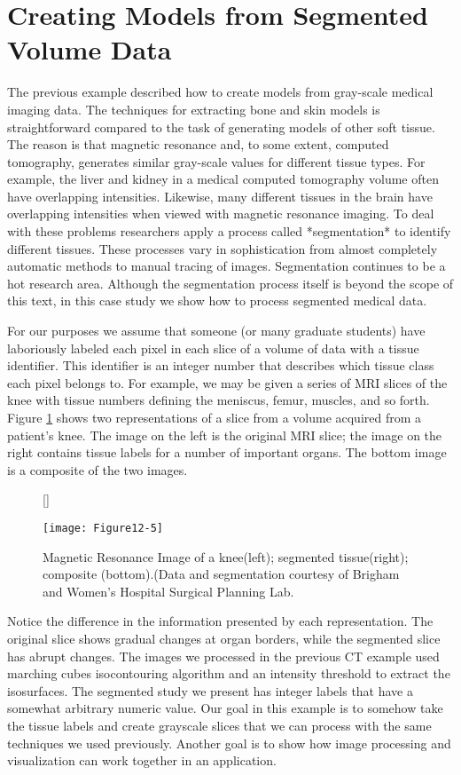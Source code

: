 \section{Creating Models from Segmented Volume Data}

The previous example described how to create models from gray-scale medical imaging data. The techniques for extracting bone and skin models is straightforward compared to the task of generating models of other soft tissue. The reason is that magnetic resonance and, to some extent, computed tomography, generates similar gray-scale values for different tissue types. For example, the liver and kidney in a medical computed tomography volume often have overlapping intensities. Likewise, many different tissues in the brain have overlapping intensities when viewed with magnetic resonance imaging. To deal with these problems researchers apply a process called *segmentation* to identify different tissues. These processes vary in sophistication from almost completely automatic methods to manual tracing of images. Segmentation continues to be a hot research area. Although the segmentation process itself is beyond the scope of this text, in this case study we show how to process segmented medical data.

For our purposes we assume that someone (or many graduate students) have laboriously labeled each pixel in each slice of a volume of data with a tissue identifier. This identifier is an integer number that describes which tissue class each pixel belongs to. For example, we may be given a series of MRI slices of the knee with tissue numbers defining the meniscus, femur, muscles, and so forth. Figure \ref{fig:Figure12-5} shows two representations of a slice from a volume acquired from a patient's knee. The image on the left is the original MRI slice; the image on the right contains tissue labels for a number of important organs. The bottom image is a composite of the two images.

\begin{figure}[!htb]
	[\FBwidth]
	{\caption{Magnetic Resonance Image of a knee(left); segmented tissue(right); composite (bottom).(Data and segmentation courtesy of Brigham and Women's Hospital Surgical Planning Lab.}\label{fig:Figure12-5}}
	{\texttt{[image: Figure12-5]}}
\end{figure}

Notice the difference in the information presented by each representation. The original slice shows gradual changes at organ borders, while the segmented slice has abrupt changes. The images we processed in the previous CT example used marching cubes isocontouring algorithm and an intensity threshold to extract the isosurfaces. The segmented study we present has integer labels that have a somewhat arbitrary numeric value. Our goal in this example is to somehow take the tissue labels and create grayscale slices that we can process with the same techniques we used previously. Another goal is to show how image processing and visualization can work together in an application.

